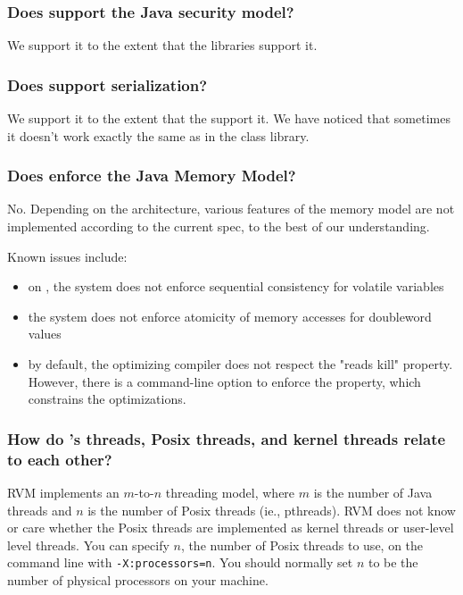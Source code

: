 \subsubsection{Does \jrvm{} support the Java security model?} 

We support it to the extent that the 
libraries support it.

\subsubsection{Does \jrvm{} support serialization?}

We support it to the extent that the 
support it. We have noticed that sometimes it doesn't
work exactly the same as in the \SunRweb{} class library.

\subsubsection{Does \jrvm{} enforce the Java Memory Model?}

No. Depending on the architecture, various features of the memory model
are not implemented according to the current spec, to the best of our
understanding.

Known issues include:
\begin{itemize}
\item on \PowerPCTM{}, the system does not enforce
sequential consistency for volatile variables
\item the system does not enforce atomicity of memory accesses for
doubleword values
\item by default, the optimizing compiler does not respect the "reads
kill" property.  However, there is a command-line option to enforce the
property, which constrains the optimizations.
\end{itemize}

\subsubsection{How do \jrvm{}'s threads, Posix threads, and kernel
threads relate to each other?}

RVM implements an $m$-to-$n$ threading model, where $m$ is the number of 
Java threads and $n$ is the number of Posix threads (ie., pthreads).  RVM
does not know or care whether the Posix threads are implemented as kernel
threads or user-level level threads.  You can specify $n$, the number of
Posix threads to use, on the command line with {\tt -X:processors=n}.
You should normally set $n$ to be the number of physical processors on
your machine.  

